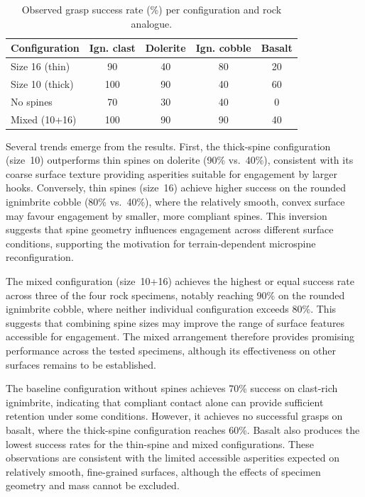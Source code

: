 \documentclass[letterpaper, 10 pt, conference, twoside]{ieeetran}
\begin{document}
\begin{table}[h]
\caption{Observed grasp success rate (\%) per configuration and rock analogue.}
\label{tab:grasping}
\centering
\footnotesize
\renewcommand{\arraystretch}{1.3}
\setlength{\tabcolsep}{4pt}
\begin{tabular}{lcccc}
\hline
\textbf{Configuration} & \textbf{Ign. clast} & \textbf{Dolerite} & \textbf{Ign. cobble} & \textbf{Basalt} \\
\hline
Size 16 (thin)   & 90 & 40 & 80 & 20 \\
Size 10 (thick)  & 100 & 90 & 40 & 60 \\
No spines        & 70 & 30 & 40 & 0  \\
Mixed (10+16)    & 100 & 90 & 90 & 40 \\
\hline
\end{tabular}
\vspace{-3mm}
\end{table}


Several trends emerge from the results. First, the thick-spine configuration (size~10) outperforms thin spines on dolerite (90\% vs.\ 40\%), consistent with its coarse surface texture providing asperities suitable for engagement by larger hooks. Conversely, thin spines (size~16) achieve higher success on the rounded ignimbrite cobble (80\% vs.\ 40\%), where the relatively smooth, convex surface may favour engagement by smaller, more compliant spines. This inversion suggests that spine geometry influences engagement across different surface conditions, supporting the motivation for terrain-dependent microspine reconfiguration.


The mixed configuration (size~10+16) achieves the highest or equal success rate across three of the four rock specimens, notably reaching 90\% on the rounded ignimbrite cobble, where neither individual configuration exceeds 80\%. This suggests that combining spine sizes may improve the range of surface features accessible for engagement. The mixed arrangement therefore provides promising performance across the tested specimens, although its effectiveness on other surfaces remains to be established.

The baseline configuration without spines achieves 70\% success on clast-rich ignimbrite, indicating that compliant contact alone can provide sufficient retention under some conditions. However, it achieves no successful grasps on basalt, where the thick-spine configuration reaches 60\%. Basalt also produces the lowest success rates for the thin-spine and mixed configurations. These observations are consistent with the limited accessible asperities expected on relatively smooth, fine-grained surfaces, although the effects of specimen geometry and mass cannot be excluded.
\end{document}
